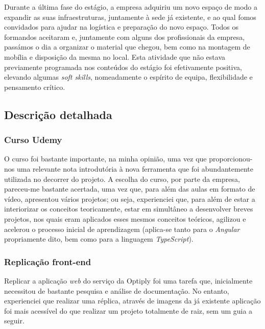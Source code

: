 \documentclass{article}
\begin{document}
\hspace*{0.5cm} Durante a última fase do estágio, a empresa adquiriu um novo espaço de modo a expandir as suas infraestruturas, juntamente à sede já existente, e ao qual fomos convidados para ajudar na logística e preparação do novo espaço. Todos os formandos aceitaram e, juntamente com alguns dos profissionais da empresa, passámos o dia a organizar o material que chegou, bem como na montagem de mobília e disposição da mesma no local. Esta atividade que não estava previamente programada nos conteúdos do estágio foi efetivamente positiva, elevando algumas \emph{soft skills}, nomeadamente o espírito de equipa, flexibilidade e pensamento crítico. \newline

\subsection{Descrição detalhada}
\subsubsection{Curso Udemy}
\hspace*{0.5cm} O curso foi bastante importante, na minha opinião, uma vez que proporcionou-nos uma relevante nota introdutória à nova ferramenta que foi abundantemente utilizada no decorrer do projeto. A escolha do curso, por parte da empresa, pareceu-me bastante acertada, uma vez que, para além das aulas em formato de vídeo, apresentou vários projetos; ou seja, experienciei que, para além de estar a interiorizar os conceitos teoricamente, estar em simultâneo a desenvolver breves projetos, nos quais eram aplicados esses mesmos conceitos teóricos, agilizou e acelerou o processo inicial de aprendizagem (aplica-se tanto para o \emph{Angular} propriamente dito, bem como para a linguagem \emph{TypeScript}).

\subsubsection{Replicação front-end}
\hspace*{0.5cm} Replicar a aplicação \emph{web} do serviço da Optiply foi uma tarefa que, inicialmente necessitou de bastante pesquisa e análise de documentação. No entanto, experienciei que realizar uma réplica, através de imagens da já existente aplicação foi mais acessível do que realizar um projeto totalmente de raiz, sem um guia a seguir. \newline
\end{document}
